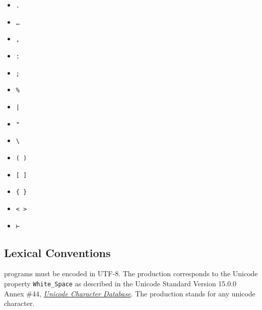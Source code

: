{\setlength{\columnseprule}{0.4pt}
\begin{multicols}{3}
\begin{itemize}[label={}, nolistsep]
\item \texttt{.}
\item \texttt{…}
\item \texttt{,}
\item \texttt{:}
\item \texttt{;}
\item \texttt{\%}
\item \texttt{|}
\item \texttt{"}
\item \texttt{\textbackslash}
\item \texttt{( )}
\item \texttt{[ ]}
\item \texttt{\{ \}}
\item \texttt{< >}
\item \texttt{⊢}
\end{itemize}
\end{multicols}
}

\subsection{Lexical Conventions}\label{section:lexical-convention}

\Beluga programs must be encoded in \textsc{UTF-8}.
The production  corresponds to the Unicode property \texttt{White\_Space} as described in the Unicode Standard Version 15.0.0 Annex \#44, \href{https://www.unicode.org/reports/tr44/tr44-30.html#White_Space}{\textit{Unicode Character Database}}.
The production  stands for any unicode character.

